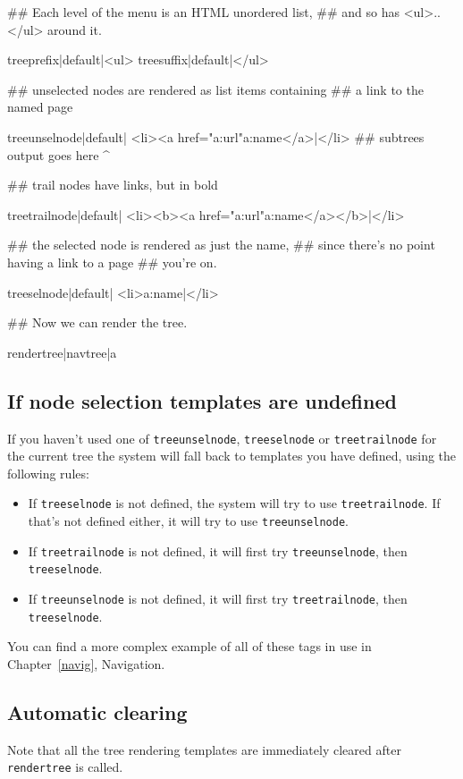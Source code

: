 \begin{MyVerbatim}
## Each level of the menu is an HTML unordered list,
## and so has <ul>.. </ul> around it.

{{treeprefix|default|<ul>}}
{{treesuffix|default|</ul>}}

## unselected nodes are rendered as list items containing
## a link to the named page

{{treeunselnode|default|
    <li><a href="{{a:url}}"{{a:name}}</a>|</li>
    ##         subtrees output goes here ^
}}

## trail nodes have links, but in bold

{{treetrailnode|default|
    <li><b><a href="{{a:url}}"{{a:name}}</a></b>|</li>
}}

## the selected node is rendered as just the name,
## since there's no point having a link to a page
## you're on.

{{treeselnode|default|
    <li>{{a:name}}|</li>
}}


## Now we can render the tree.

{{rendertree|{{navtree}}|a}}
\end{MyVerbatim}

\clearpage
\subsection{If node selection templates are undefined}
\label{unspectreetemps}
If you haven't used one of \texttt{treeunselnode}, \texttt{treeselnode} or
\texttt{treetrailnode} for the current tree the system will fall back to
templates you have defined, using the following rules:
\begin{itemize}
\item If \texttt{treeselnode} is not defined, the system will try to use \texttt{treetrailnode}. If that's
not defined either, it will try to use \texttt{treeunselnode}.
\item If \texttt{treetrailnode} is not defined, it will first try \texttt{treeunselnode}, then \texttt{treeselnode}.
\item If \texttt{treeunselnode} is not defined, it will first try \texttt{treetrailnode}, then \texttt{treeselnode}.
\end{itemize}

You can find a more complex example of all of these tags in use in Chapter~\ref{navig}, Navigation.

\subsection{Automatic clearing}
Note that all the tree rendering templates are immediately cleared
after \texttt{rendertree} is called.

